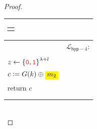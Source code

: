 \documentclass[12pt,openany]{book}
\newcommand{\mathcolorbox}[2]{\colorbox{#1}{$\displaystyle #2$}}
\theoremstyle{definition}
\newcommand{\library}{\mathcal{L}}
\newcommand{\zero}{\textcolor{red}{\texttt{0}}}
\newcommand{\one}{\textcolor{red}{\texttt{1}}}
\newcommand{\tab}{\hspace{12pt}}
\newcommand{\binaryfield}{\set{\zero,\one}}
\newcommand{\otp}{\mathsf{OTP}}
\newcommand{\ots}{\mathsf{ots}}
\begin{document}
\begin{proof}
\begin{table}[h!]
{\begin{tabularx}{\textwidth}{X|X}
\begin{tabular}{|c|}
\begin{tabular}{l}
				\end{tabular}\\
				\hline
			\end{tabular}
			&
			$\library_{\mathsf{hyp}-4}$: \begin{tabular}{|c|}
				\hline
				\cellcolor{blue!25}$\library_{\ots-2}^{\otp}$\\
				\hline
				\begin{tabular}{l}
					\underline{\texttt{Eve}($m_1,m_2$):}\\
					\tab ${z\gets\binaryfield^{\lambda+l}}$\\
					\tab $c:=G(k)\oplus \mathcolorbox{yellow}{m_2}$\\
					\tab return $c$
				\end{tabular}\\
				\hline
			\end{tabular}\\
			\\
			\hline
		\end{tabularx}}
	\end{table}\\
\end{proof}

\newpage
\end{document}
